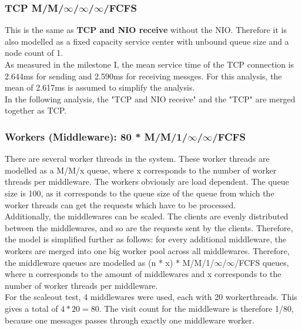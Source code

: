 \documentclass[a4paper]{article}
\begin{document}
\subsubsection{TCP M/M/$\infty$/$\infty$/$\infty$/FCFS}

This is the same as \textbf{TCP and NIO receive} without the NIO. Therefore it is also modelled as a fixed capacity service center with unbound queue size and a node count of 1.\\

As measured in the milestone I\cite{milestone1}, the mean service time of the TCP connection is 2.644ms for sending and 2.590ms for receiving messges. For this analysis, the mean of 2.617ms is assumed to simplify the analysis.\\

In the following analysis, the "TCP and NIO receive" and the "TCP" are merged together as TCP.


\subsubsection{Workers (Middleware): 80 * M/M/1/$\infty$/$\infty$/FCFS}

There are several worker threads in the system. These worker threads are modelled as a M/M/x queue, where x corresponds to the number of worker threads per middleware. The workers obviously are load dependent. The queue size is 100, as it corresponds to the queue size of the queue from which the worker threads can get the requests which have to be processed.\\

Additionally, the middlewares can be scaled. The clients are evenly distributed between the middlewares, and so are the requests sent by the clients. Therefore, the model is simplified further as follows: for every additional middleware, the workers are merged into one big worker pool across all middlewares. Therefore, the middleware queues are modelled as (n * x) * M/M/1/$\infty$/$\infty$/FCFS queues, where n corresponds to the amount of middlewares and x corresponds to the number of worker threads per middleware.\\

For the scaleout test, 4 middlewares were used, each with 20 workerthreads. This gives a total of $4*20 = 80$. The visit count for the middleware is therefore 1/80, because one messages passes through exactly one middleware worker.\\
\end{document}
